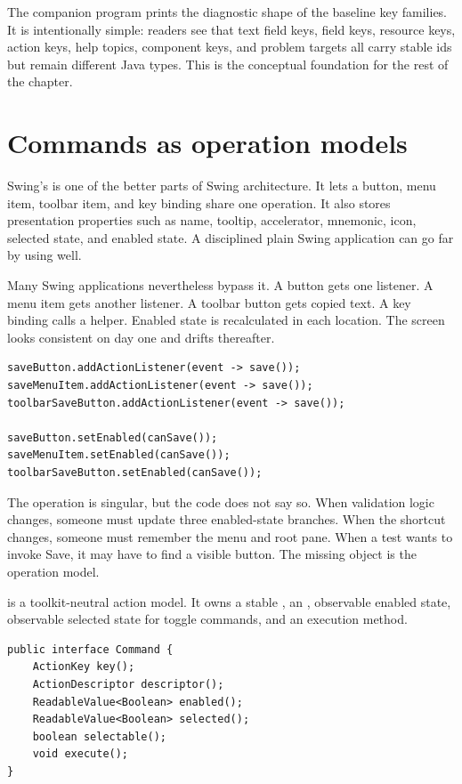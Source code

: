 The \typedKeyExample{} companion program prints the diagnostic shape of the
baseline key families. It is intentionally simple: readers see that text field
keys, field keys, resource keys, action keys, help topics, component keys, and
problem targets all carry stable ids but remain different Java types. This is
the conceptual foundation for the rest of the chapter.

\section{Commands as operation models}

Swing's  is one of the better parts of Swing architecture. It lets
a button, menu item, toolbar item, and key binding share one operation. It also
stores presentation properties such as name, tooltip, accelerator, mnemonic,
icon, selected state, and enabled state. A disciplined plain Swing application
can go far by using  well.

Many Swing applications nevertheless bypass it. A button gets one listener. A
menu item gets another listener. A toolbar button gets copied text. A key
binding calls a helper. Enabled state is recalculated in each location. The
screen looks consistent on day one and drifts thereafter.

\begin{lstlisting}[caption={The duplicated-listener smell.}]
saveButton.addActionListener(event -> save());
saveMenuItem.addActionListener(event -> save());
toolbarSaveButton.addActionListener(event -> save());

saveButton.setEnabled(canSave());
saveMenuItem.setEnabled(canSave());
toolbarSaveButton.setEnabled(canSave());
\end{lstlisting}

The operation is singular, but the code does not say so. When validation logic
changes, someone must update three enabled-state branches. When the shortcut
changes, someone must remember the menu and root pane. When a test wants to
invoke Save, it may have to find a visible button. The missing object is the
operation model.

 is a toolkit-neutral action model. It owns a
stable , an , observable enabled state,
observable selected state for toggle commands, and an execution method.

\begin{lstlisting}[caption={The command contract in miniature.}]
public interface Command {
    ActionKey key();
    ActionDescriptor descriptor();
    ReadableValue<Boolean> enabled();
    ReadableValue<Boolean> selected();
    boolean selectable();
    void execute();
}
\end{lstlisting}

